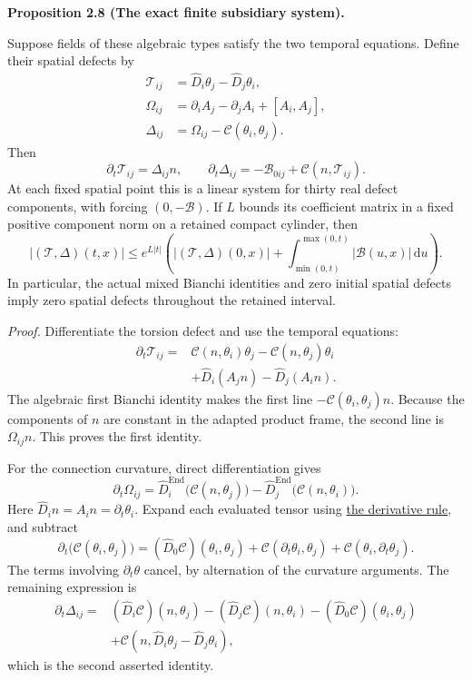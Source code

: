 \documentclass[
  english,
  11pt,
  reqno]{amsart}
\makeatletter
\newcommand{\pandocstatementheading}[1]{%
  \par\if@nobreak\else
    \addpenalty{\@beginparpenalty}%
    \addvspace{.5\baselineskip plus .2\baselineskip minus .2\baselineskip}%
  \fi
  {\normalfont\bfseries #1\par}%
  \nobreak\@afterindenttrue\@afterheading
}
\makeatother
\begin{document}
\pandocstatementheading{\leavevmode{}\label{prop:online-cartan-subsidiary-system}Proposition 2.8 (The exact finite subsidiary system).}

Suppose fields of these algebraic types satisfy the two temporal
equations. Define their spatial defects by%
 \[
\begin{aligned}
\mathcal T_{ij}
&=\widehat D_i\theta_j-\widehat D_j\theta_i,\\
\Omega_{ij}
&=\partial_i A_j-\partial_j A_i+[A_i,A_j],\\
\Delta_{ij}
&=\Omega_{ij}-\mathcal C(\theta_i,\theta_j).
\end{aligned}
\] Then%
 \[
\partial_t\mathcal T_{ij}=\Delta_{ij}n,
\qquad
\partial_t\Delta_{ij}
=-\mathcal B_{0ij}+\mathcal C(n,\mathcal T_{ij}).
\] At each fixed spatial point this is a linear system for thirty real
defect components, with forcing \((0,-\mathcal B)\). If \(L\) bounds its
coefficient matrix in a fixed positive component norm on a retained
compact cylinder, then%
 \[
|(\mathcal T,\Delta)(t,x)|
\le e^{L|t|}
\left(
|(\mathcal T,\Delta)(0,x)|
+\int_{\min(0,t)}^{\max(0,t)}
|\mathcal B(u,x)|\,\mathrm du
\right).
\] In particular, the actual mixed Bianchi identities and zero initial
spatial defects imply zero spatial defects throughout the retained
interval.

\emph{Proof.} Differentiate the torsion defect and use the temporal
equations: \[
\begin{aligned}
\partial_t\mathcal T_{ij}
={}&\mathcal C(n,\theta_i)\theta_j
-\mathcal C(n,\theta_j)\theta_i\\
&+\widehat D_i(A_jn)-\widehat D_j(A_in).
\end{aligned}
\] The algebraic first Bianchi identity makes the first line
\(-\mathcal C(\theta_i,\theta_j)n\). Because the components of \(n\) are
constant in the adapted product frame, the second line is
\(\Omega_{ij}n\). This proves the first identity.

For the connection curvature, direct differentiation gives \[
\partial_t\Omega_{ij}
=\widehat D_i^{\operatorname{End}}\bigl(\mathcal C(n,\theta_j)\bigr)
-\widehat D_j^{\operatorname{End}}\bigl(\mathcal C(n,\theta_i)\bigr).
\] Here \(\widehat D_i n=A_i n=\partial_t\theta_i\). Expand each
evaluated tensor using
\hyperref[eq:online-cartan-evaluated-tensor-derivative]{the derivative
rule}, and subtract \[
\partial_t\bigl(\mathcal C(\theta_i,\theta_j)\bigr)
=(\widehat D_0\mathcal C)(\theta_i,\theta_j)
+\mathcal C(\partial_t\theta_i,\theta_j)
+\mathcal C(\theta_i,\partial_t\theta_j).
\] The terms involving \(\partial_t\theta\) cancel, by alternation of
the curvature arguments. The remaining expression is \[
\begin{aligned}
\partial_t\Delta_{ij}
={}&(\widehat D_i\mathcal C)(n,\theta_j)
-(\widehat D_j\mathcal C)(n,\theta_i)
-(\widehat D_0\mathcal C)(\theta_i,\theta_j)\\
&+\mathcal C(n,\widehat D_i\theta_j-\widehat D_j\theta_i),
\end{aligned}
\] which is the second asserted identity.
\end{document}
